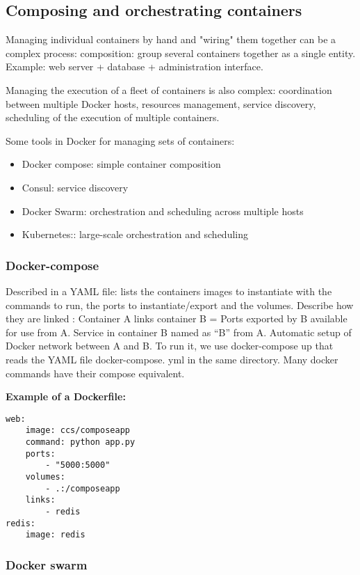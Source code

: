 \subsection{Composing and orchestrating containers}

Managing individual containers by hand and "wiring" them together can be a complex process: composition: group several containers together as a single entity. Example: web server + database + administration interface.

Managing the execution of a fleet of containers is also complex: coordination between multiple Docker hosts, resources management, service discovery, scheduling of the execution of multiple containers.

Some tools in Docker for managing sets of containers:
\begin{itemize}
    \item Docker compose: simple container composition
    \item Consul: service discovery
    \item Docker Swarm: orchestration and scheduling across multiple hosts
    \item Kubernetes:: large-scale orchestration and scheduling
\end{itemize}

\subsubsection{Docker-compose}

Described in a YAML file: lists the containers images to instantiate with the commands to run, the ports to instantiate/export and the volumes. Describe how they are linked : Container A links container B = Ports exported by B available for use from A. Service in container B named as “B” from A. Automatic setup of Docker network between A and B. To run it, we use docker-compose up that reads the YAML file docker-compose. yml in the same directory. Many docker commands have their compose equivalent.

\textbf{Example of a Dockerfile:}
\begin{verbatim}
web:
    image: ccs/composeapp
    command: python app.py
    ports:
        - "5000:5000"
    volumes:
        - .:/composeapp
    links:
        - redis
redis:
    image: redis
\end{verbatim}

\subsubsection{Docker swarm}

